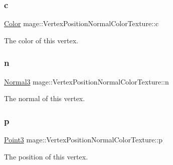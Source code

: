 \subsubsection{\texorpdfstring{c}{c}}
{\footnotesize\ttfamily \hyperlink{structmage_1_1_color}{Color} mage\+::\+Vertex\+Position\+Normal\+Color\+Texture\+::c}

The color of this vertex. \hypertarget{structmage_1_1_vertex_position_normal_color_texture_a7304bf677ad4f16aea974e63f4324eba}{}\label{structmage_1_1_vertex_position_normal_color_texture_a7304bf677ad4f16aea974e63f4324eba} 
\subsubsection{\texorpdfstring{n}{n}}
{\footnotesize\ttfamily \hyperlink{structmage_1_1_normal3}{Normal3} mage\+::\+Vertex\+Position\+Normal\+Color\+Texture\+::n}

The normal of this vertex. \hypertarget{structmage_1_1_vertex_position_normal_color_texture_ac7808865ca6672b7d0f4f8457077bd16}{}\label{structmage_1_1_vertex_position_normal_color_texture_ac7808865ca6672b7d0f4f8457077bd16} 
\subsubsection{\texorpdfstring{p}{p}}
{\footnotesize\ttfamily \hyperlink{structmage_1_1_point3}{Point3} mage\+::\+Vertex\+Position\+Normal\+Color\+Texture\+::p}

The position of this vertex. \hypertarget{structmage_1_1_vertex_position_normal_color_texture_a95286a5de390f414f036371f4ad08de1}{}\label{structmage_1_1_vertex_position_normal_color_texture_a95286a5de390f414f036371f4ad08de1} 
